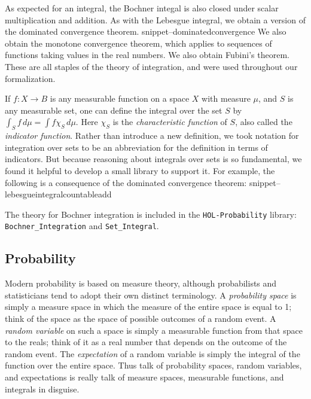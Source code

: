 \documentclass{svjour3}
\newcommand{\Snippet}[1]{\csname snippet--#1\endcsname}
\begin{document}
As expected for an integral, the Bochner integal is also closed under scalar multiplication and addition. As with the Lebesgue integral, we obtain a version of the dominated convergence theorem.
\Snippet{dominatedconvergence}
We also obtain the monotone convergence theorem, which applies to sequences of functions taking values in the real numbers. We also obtain Fubini's theorem. These are all staples of the theory of integration, and were used throughout our formalization.

If $f : X \to B$ is any measurable function on a space $X$ with measure $\mu$, and $S$ is any measurable set, one can define the integral over the set $S$ by $\int_S f \, d\mu = \int f \chi_S \, d\mu$. Here $\chi_S$ is the \emph{characteristic function} of $S$, also called the \emph{indicator function}. Rather than introduce a new definition, we took notation for integration over sets to be an abbreviation for the definition in terms of indicators. But because reasoning about integrals over sets is so fundamental, we found it helpful to develop a small library to support it. For example, the following is a consequence of the dominated convergence theorem:
\Snippet{lebesgueintegralcountableadd}

The theory for Bochner integration is included in the \texttt{HOL-Probability} library: \verb=Bochner_Integration= and \verb=Set_Integral=.

\subsection{Probability}
\label{subsection:probability}

Modern probability is based on measure theory, although probabilists and statisticians tend to adopt their own distinct terminology. A \emph{probability space} is simply a measure space in which the measure of the entire space is equal to 1; think of the space as the space of possible outcomes of a random event. A \emph{random variable} on such a space is simply a measurable function from that space to the reals; think of it as a real number that depends on the outcome of the random event. The \emph{expectation} of a random variable is simply the integral of the function over the entire space. Thus talk of probability spaces, random variables, and expectations is really talk of measure spaces, measurable functions, and integrals in disguise.
\end{document}
